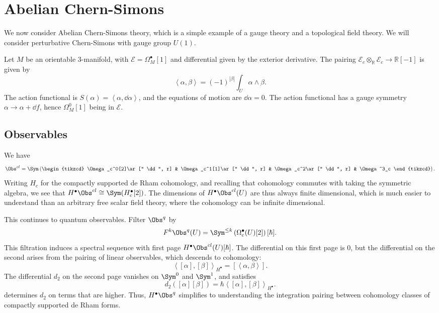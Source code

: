 \section{Abelian Chern-Simons}

We now consider Abelian Chern-Simons theory, which is a simple example of a gauge theory and a topological field theory. We will consider perturbative Chern-Simons with gauge group $U(1)$.

Let $M$ be an orientable 3-manifold, with $\mathcal{E} =\Omega _M^{\bullet} [1]$ and differential given by the exterior derivative. The pairing $\mathcal{E} _c\otimes _{\mathbb{R} } \mathcal{E} _c\to \mathbb{R}[-1]$ is given by
\[
	\left\langle \alpha ,\beta  \right\rangle =(-1)^{\left| \beta  \right| } \int_{U} \alpha \wedge \beta 
.\]
The action functional is $S(\alpha )=\left\langle \alpha ,\dd \alpha  \right\rangle $, and the equations of motion are $\dd \alpha =0$. The action functional has a gauge symmetry $\alpha \to \alpha +\dd f$, hence $\Omega ^0_M[1]$ being in $\mathcal{E} $.

\subsection{Observables}

We have
\[
	\Obs^{cl} =\Sym\left( 
	\begin{tikzcd}
		\Omega _c^0[2]\ar[" \dd  ", r] & \Omega _c^1[1]\ar[" \dd  ", r] & \Omega _c^2\ar[" \dd  ", r] & \Omega ^3_c
	\end{tikzcd}
	\right) 
.\]
Writing $H_c$ for the compactly supported de Rham cohomology, and recalling that cohomology commutes with taking the symmetric algebra, we see that $H^{\bullet} \Obs^{cl} \cong \Sym (H_c^{\bullet}[2]) $. The dimensions of $H^{\bullet} \Obs^{cl} (U)$ are thus always finite dimensional, which is much easier to understand than an arbitrary free scalar field theory, where the cohomology can be infinite dimensional.

This continues to quantum observables. Filter $\Obs^{q} $ by
\[
	F^k \Obs^{q} (U) = \Sym ^{\leq k} \left( \Omega^{\bullet} _c(U)[2] \right) [\hbar ]
.\]
This filtration induces a spectral sequence with first page $H^{\bullet} \Obs^{cl} (U)[\hbar ]$. The differential on this first page is 0, but the differential on the second arises from the pairing of linear observables, which descends to cohomology:
\[
	\left\langle [\alpha ],[\beta ] \right\rangle_{H^{\bullet} } = [\left\langle \alpha ,\beta  \right\rangle ]
.\]
The differential $d_2$ on the second page vanishes on $\Sym^0$ and $\Sym ^1$, and satisfies
\[
	d_2([\alpha ][\beta ])=\hbar \left\langle [\alpha ],[\beta ] \right\rangle_{H^{\bullet} } 
.\]
 determines $d_2$ on terms that are higher. Thus, $H^{\bullet} \Obs^{q} $ simplifies to understanding the integration pairing between cohomology classes of compactly supported de Rham forms.

